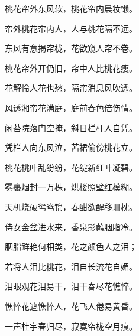 \begin{poem}
    \begin{pl}

        桃花帘外东风软，桃花帘内晨妆懒。
    \end{pl}
    \begin{pl}

        帘外桃花帘内人，人与桃花隔不远。
    \end{pl}
    \begin{pl}

        东风有意揭帘栊，花欲窥人帘不卷。
    \end{pl}
    \begin{pl}

        桃花帘外开仍旧，帘中人比桃花瘦。
    \end{pl}
    \begin{pl}

        花解怜人花也愁，隔帘消息风吹透。
    \end{pl}
    \begin{pl}

        风透湘帘花满庭，庭前春色倍伤情。
    \end{pl}
    \begin{pl}

        闲苔院落门空掩，斜日栏杆人自凭。
    \end{pl}
    \begin{pl}

        凭栏人向东风泣，茜裙偷傍桃花立。
    \end{pl}
    \begin{pl}

        桃花桃叶乱纷纷，花绽新红叶凝碧。
    \end{pl}
    \begin{pl}

        雾裹烟封一万株，烘楼照壁红模糊。
    \end{pl}
    \begin{pl}

        天机烧破鸳鸯锦，春酣欲醒移珊枕。
    \end{pl}
    \begin{pl}

        侍女金盆进水来，香泉影蘸胭脂冷。
    \end{pl}
    \begin{pl}

        胭脂鲜艳何相类，花之颜色人之泪；
    \end{pl}
    \begin{pl}

        若将人泪比桃花，泪自长流花自媚。
    \end{pl}
    \begin{pl}

        泪眼观花泪易干，泪干春尽花憔悴。
    \end{pl}
    \begin{pl}

        憔悴花遮憔悴人，花飞人倦易黄昏。
    \end{pl}
    \begin{pl}

        一声杜宇春归尽，寂寞帘栊空月痕。
    \end{pl}

\end{poem}
